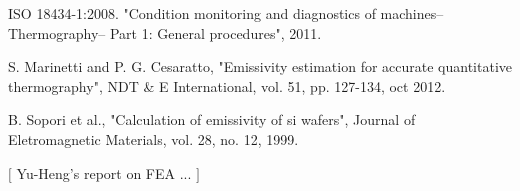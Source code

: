 \begin{enumerate}[label={[\arabic*]}]
		\item ISO 18434-1:2008. "Condition monitoring and diagnostics of machines–Thermography– Part 1: General procedures", 2011.
		
		\item S. Marinetti and P. G. Cesaratto, "Emissivity estimation for accurate quantitative thermography", NDT \& E International, vol. 51, pp. 127-134, oct 2012.
		
		\item B. Sopori et al., "Calculation of emissivity of si wafers", Journal of Eletromagnetic Materials, vol. 28, no. 12, 1999.
		
		\item $[$ Yu-Heng's report on FEA ... $]$
	\end{enumerate}